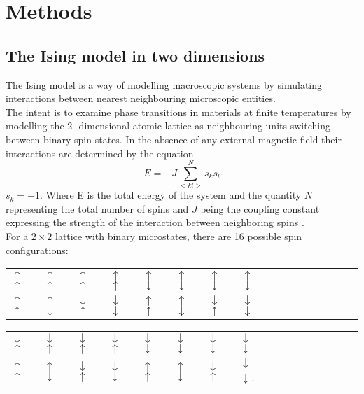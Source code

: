 \documentclass[10pt,a4paper]{article}
\begin{document}
\section{Methods}
\subsection{The Ising model in two dimensions}
The Ising model is a way of modelling macroscopic systems by simulating interactions between nearest neighbouring microscopic entities.\\The intent is to examine phase transitions in materials at finite temperatures by modelling the 2- dimensional atomic lattice as neighbouring units switching between  binary spin states. In the absence of any external magnetic field their interactions are determined by the equation
\begin{equation} \label{2d-ising energy}
E=-J\sum_{< kl >}^{N}s_ks_l 
\end{equation}
$s_k=\pm 1$. Where E is the total energy of the system and the quantity $N$ representing the total number of spins and $J$ being the coupling constant expressing the strength of the interaction between
neighboring spins \cite{Lecture_Notes_Fall_2015}.\\For a $2\times2$ lattice with binary microstates, there are 16 possible spin configurations:
\begin{table}[H]
\begin{tabular}{llllllllllllllll}
 $\uparrow$ $\uparrow$ &  $\uparrow$ $\uparrow$ &  $\uparrow$ $\uparrow$ &  $\uparrow$ $\uparrow$ &  $\uparrow$ $\downarrow$ &  $\uparrow$ $\downarrow$ & $\uparrow$ $\downarrow$ & $\uparrow$ $\downarrow$ \\
 $\uparrow$ $\uparrow$&  $\uparrow$ $\downarrow$ &  $\downarrow$ $\uparrow$ &  $\downarrow$ $\downarrow$ &  $\uparrow$ $\uparrow$ &  $\uparrow$ $\downarrow$ &  $\downarrow$ $\uparrow$ &  $\downarrow$ $\downarrow$
\end{tabular}
\end{table}
\begin{table}[H]
\begin{tabular}{llllllllllllllll}
 $\downarrow$ $\uparrow$ & $\downarrow$ $\uparrow$ & $\downarrow$ $\uparrow$ & $\downarrow$ $\uparrow$ & $\downarrow$ $\downarrow$ & $\downarrow$ $\downarrow$ &  $\downarrow$ $\downarrow$ & $\downarrow$ $\downarrow$ \\
 $\uparrow$ $\uparrow$ & $\uparrow$ $\downarrow$ & $\downarrow$ $\uparrow$ & $\downarrow$ $\downarrow$ & $\uparrow$ $\uparrow$ & $\uparrow$ $\downarrow$ & $\downarrow$ $\uparrow$ & $\downarrow$ $\downarrow$.
\end{tabular}
\end{table}
\end{document}
